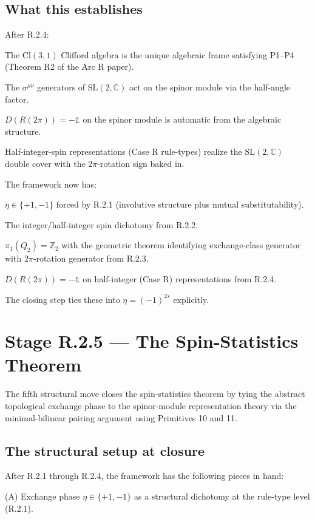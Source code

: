 \documentclass[11pt,a4paper]{article}
\begin{document}
\subsection{What this establishes}

After R.2.4:

The $\mathrm{Cl}(3,1)$ Clifford algebra is the unique algebraic frame satisfying P1--P4 (Theorem R2 of the Arc R paper).

The $\sigma^{\mu\nu}$ generators of $\mathrm{SL}(2,\mathbb{C})$ act on the spinor module via the half-angle factor.

$D(R(2\pi)) = -\mathbb{1}$ on the spinor module is automatic from the algebraic structure.

Half-integer-spin representations (Case R rule-types) realize the $\mathrm{SL}(2,\mathbb{C})$ double cover with the $2\pi$-rotation sign baked in.

The framework now has:

$\eta \in \{+1, -1\}$ forced by R.2.1 (involutive structure plus mutual substitutability).

The integer/half-integer spin dichotomy from R.2.2.

$\pi_1(Q_2) = \mathbb{Z}_2$ with the geometric theorem identifying exchange-class generator with $2\pi$-rotation generator from R.2.3.

$D(R(2\pi)) = -\mathbb{1}$ on half-integer (Case R) representations from R.2.4.

The closing step ties these into $\eta = (-1)^{2s}$ explicitly.

\section{Stage R.2.5 --- The Spin-Statistics Theorem}

The fifth structural move closes the spin-statistics theorem by tying the abstract topological exchange phase to the spinor-module representation theory via the minimal-bilinear pairing argument using Primitives 10 and 11.

\subsection{The structural setup at closure}

After R.2.1 through R.2.4, the framework has the following pieces in hand:

(A) Exchange phase $\eta \in \{+1, -1\}$ as a structural dichotomy at the rule-type level (R.2.1).
\end{document}
